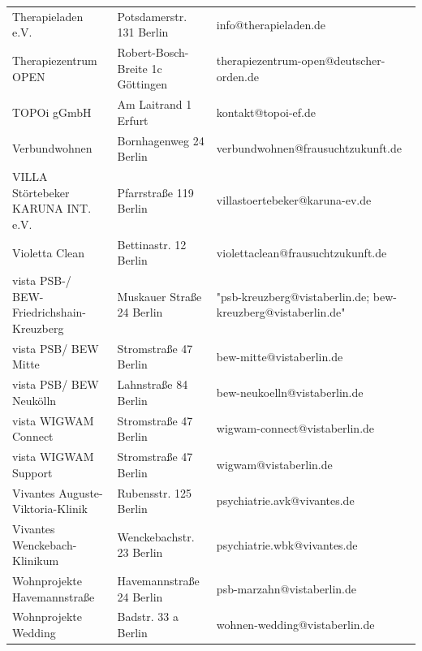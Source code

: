 {\begin{xltabular}{\textwidth} {
 >{\raggedright\arraybackslash}p{5cm}
 >{\raggedright\arraybackslash}X
 >{\raggedright\arraybackslash}p{5cm} }
Therapieladen e.V. & Potsdamerstr. 131 Berlin & info@therapieladen.de \\
Therapiezentrum OPEN & Robert-Bosch-Breite 1c Göttingen & therapiezentrum-open@deutscher-orden.de \\
TOPOi gGmbH & Am Laitrand 1 Erfurt & kontakt@topoi-ef.de \\
Verbundwohnen & Bornhagenweg 24 Berlin & verbundwohnen@frausuchtzukunft.de \\
VILLA Störtebeker KARUNA INT. e.V. & Pfarrstraße 119 Berlin & villastoertebeker@karuna-ev.de \\
Violetta Clean & Bettinastr. 12 Berlin & violettaclean@frausuchtzukunft.de \\
vista PSB-/ BEW-Friedrichshain-Kreuzberg & Muskauer Straße 24 Berlin & "psb-kreuzberg@vistaberlin.de; bew-kreuzberg@vistaberlin.de" \\
vista PSB/ BEW Mitte & Stromstraße 47 Berlin & bew-mitte@vistaberlin.de \\
vista PSB/ BEW Neukölln & Lahnstraße 84 Berlin & bew-neukoelln@vistaberlin.de \\
vista WIGWAM Connect & Stromstraße 47 Berlin & wigwam-connect@vistaberlin.de \\
vista WIGWAM Support & Stromstraße 47 Berlin & wigwam@vistaberlin.de \\
Vivantes Auguste-Viktoria-Klinik & Rubensstr. 125 Berlin & psychiatrie.avk@vivantes.de \\
Vivantes Wenckebach-Klinikum & Wenckebachstr. 23 Berlin & psychiatrie.wbk@vivantes.de \\
Wohnprojekte Havemannstraße & Havemannstraße 24 Berlin & psb-marzahn@vistaberlin.de \\
Wohnprojekte Wedding & Badstr. 33 a Berlin & wohnen-wedding@vistaberlin.de \\

\end{xltabular}}
